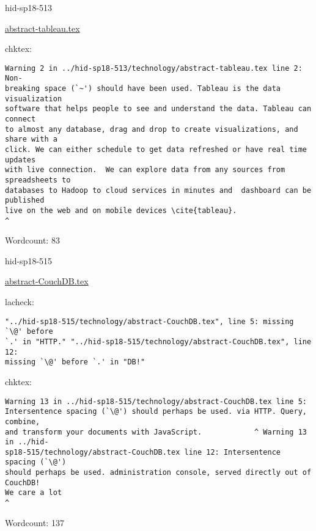 

\begin{IU}

hid-sp18-513

\href{https://github.com/cloudmesh-community/hid-sp18-513/blob/master//technology/abstract-tableau.tex}{abstract-tableau.tex}

 
chktex:
\begin{tiny}
\begin{verbatim}
Warning 2 in ../hid-sp18-513/technology/abstract-tableau.tex line 2: Non-
breaking space (`~') should have been used. Tableau is the data visualization
software that helps people to see and understand the data. Tableau can connect
to almost any database, drag and drop to create visualizations, and share with a
click. We can either schedule to get data refreshed or have real time updates
with live connection.  We can explore data from any sources from spreadsheets to
databases to Hadoop to cloud services in minutes and  dashboard can be published
live on the web and on mobile devices \cite{tableau}.
^
\end{verbatim}
\end{tiny}

Wordcount: 83

\end{IU}



\begin{IU}

hid-sp18-515

\href{https://github.com/cloudmesh-community/hid-sp18-515/blob/master//technology/abstract-CouchDB.tex}{abstract-CouchDB.tex}

 
lacheck:
\begin{tiny}
\begin{verbatim}
"../hid-sp18-515/technology/abstract-CouchDB.tex", line 5: missing `\@' before
`.' in "HTTP." "../hid-sp18-515/technology/abstract-CouchDB.tex", line 12:
missing `\@' before `.' in "DB!"
\end{verbatim}
\end{tiny}
chktex:
\begin{tiny}
\begin{verbatim}
Warning 13 in ../hid-sp18-515/technology/abstract-CouchDB.tex line 5:
Intersentence spacing (`\@') should perhaps be used. via HTTP. Query, combine,
and transform your documents with JavaScript.            ^ Warning 13 in ../hid-
sp18-515/technology/abstract-CouchDB.tex line 12: Intersentence spacing (`\@')
should perhaps be used. administration console, served directly out of CouchDB!
We care a lot                                                          ^
\end{verbatim}
\end{tiny}

Wordcount: 137

\end{IU}

